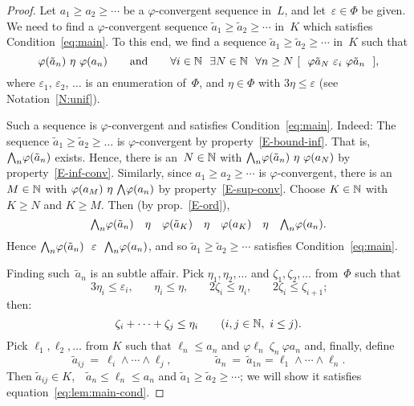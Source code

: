 \documentclass[main.tex]{subfiles}
\begin{document}
\begin{proof}
Let $a_1 \geq a_2 \geq \dotsb$ 
be a $\varphi$-convergent sequence in~$L$,
and let~$\varepsilon\in\Phi$ be given.
We need to find a $\varphi$-convergent sequence 
$\tilde a_1 \geq \tilde a_2 \geq \dotsb$ in~$K$
which satisfies Condition~\eqref{eq:main}.
To this end,
we find a sequence 
$\tilde a_1 \geq \tilde a_2 \geq \dotsb$ in~$K$
such that
\begin{equation}
\label{eq:lem:main-cond}
\varphi(\tilde a_n) \ \eta\ \varphi (a_n)
\qquad\text{and}\qquad
\forall i\in\N\ \ \exists N\in\N 
\ \ \forall n\geq N
\  [\ \  \varphi \tilde a_N \ \varepsilon_i\  \varphi \tilde a_n \ \ ],
\end{equation}
where $\varepsilon_1,\,\varepsilon_2,\,\dotsc$
is
an enumeration of~$\Phi$,
and $\eta\in\Phi$ with  $3\eta \leq \varepsilon$
(see Notation~\ref{N:unif}).

Such a sequence is $\varphi$-convergent and 
satisfies Condition~\eqref{eq:main}. 
Indeed:
The sequence
 $\tilde a_1 \geq \tilde a_2 \geq \dotsc$
is $\varphi$-convergent 
by property~\ref{E-bound-inf}.
That is, $\textstyle{\bigwedge}_n \varphi(\tilde a_n)$ exists.
Hence,
there is an~$N\in\mathbb{N}$
with 
 $\textstyle{\bigwedge}_n\varphi (\tilde a_n)\ \eta\ \varphi (a_N)$
by property~\ref{E-inf-conv}.
Similarly, 
since $a_1 \geq a_2 \geq \dotsb$ is $\varphi$-convergent,
there is an~$M\in\mathbb{N}$ with $\varphi (a_M)\ \eta\ \textstyle{\bigwedge}\varphi (a_n)$
by property~\ref{E-sup-conv}.
Choose $K\in \mathbb{N}$ with $K\geq N$ and $K\geq M$.
Then  (by prop.~\ref{E-ord}),
\begin{equation*}
\textstyle{\bigwedge}_n \varphi (\tilde a_n) \quad \eta \quad \varphi(\tilde a_K)
\quad\eta\quad \varphi(a_K) \quad\eta\quad \textstyle{\bigwedge}_n\varphi (a_n).
\end{equation*}
Hence $\bw_n \varphi (\tilde a_n) \ \ \varepsilon\ \ \bw_n\varphi(a_n)$,
and so $\tilde a_1  \geq \tilde a_2 \geq \dotsb$
satisfies Condition~\eqref{eq:main}.

Finding such~$\tilde a_n$ is an subtle affair.
Pick $\eta_1, \eta_2,\dotsc$ and $\zeta_1,\zeta_2,\dotsc$
from~$\Phi$ such that
\begin{equation*}
3 \eta_i \leq \varepsilon_i\text{,} \qquad
\eta_i \leq \eta\text{,} \qquad
2\zeta_i \leq \eta_i\text{,} \qquad
2\zeta_i \leq \zeta_{i+1}\text{;}
\end{equation*}
then:
\begin{equation}
\label{eq:lem:main-zeta--eta}
\zeta_i + \dotsb + \zeta_j \leq \eta_i \qquad (i,j\in\mathbb{N},\  i\leq j)\text{.}
\end{equation}
Pick $\ell_1,\ell_2,\dotsc$ from $K$ 
such that $\ell_n \leq a_n$ and $\varphi\ell_n\ \zeta_n\  \varphi a_n$
and, finally, define 
\begin{equation*}
\tilde{a}_{ij} \ =\ \ell_i \wedge \dotsb\wedge \ell_j\text{,}
\qquad\qquad
\tilde{a}_n \ =\ \tilde{a}_{1n} =\ell_1 \wedge\dotsb\wedge \ell_n\text{.}
\end{equation*}
Then $\tilde a_{ij} \in K$,\ \  $\tilde a_n \leq \ell_n \leq a_n$
and $\tilde a_1 \geq \tilde a_2 \geq \dotsb$;
we will show it satisfies equation~\eqref{eq:lem:main-cond}.


\end{proof}
\end{document}
